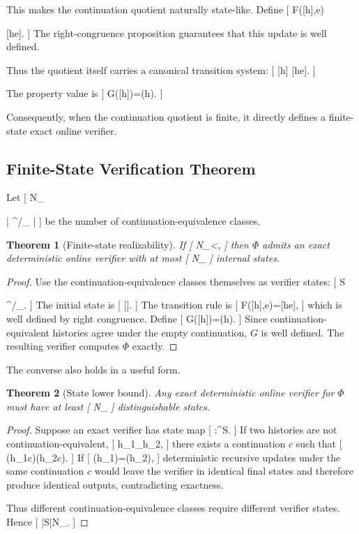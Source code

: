 \documentclass[11pt]{article}
\newtheorem{theorem}{Theorem} \newtheorem{proposition}{Proposition} \newtheorem{lemma}{Lemma} \newtheorem{corollary}{Corollary} \newtheorem{definition}{Definition} \newtheorem{remark}{Remark}
\begin{document}
This makes the continuation quotient naturally state-like. Define
[
F([h]{\equiv\Phi},e)

[he]{\equiv\Phi}.
]
The right-congruence proposition guarantees that this update is well defined.

Thus the quotient itself carries a canonical transition system:
[
[h]
[he].
]

The property value is
[
G([h])=\Phi(h).
]

Consequently, when the continuation quotient is finite, it directly defines a finite-state exact online verifier.

\subsection{Finite-State Verification Theorem}

Let
[
N_\Phi

\left|
\Sigma^\ast/{\equiv_\Phi}
\right|
]
be the number of continuation-equivalence classes.

\begin{theorem}[Finite-state realizability]
If
[
N_\Phi<\infty,
]
then $\Phi$ admits an exact deterministic online verifier with at most
[
N_\Phi
]
internal states.
\end{theorem}

\begin{proof}
Use the continuation-equivalence classes themselves as verifier states:
[
\mathcal S

\Sigma^\ast/{\equiv_\Phi}.
]
The initial state is
[
[\epsilon].
]
The transition rule is
[
F([h],e)=[he],
]
which is well defined by right congruence. Define
[
G([h])=\Phi(h).
]
Since continuation-equivalent histories agree under the empty continuation,
$G$ is well defined. The resulting verifier computes $\Phi$ exactly.
\end{proof}

The converse also holds in a useful form.

\begin{theorem}[State lower bound]
Any exact deterministic online verifier for $\Phi$ must have at least
[
N_\Phi
]
distinguishable states.
\end{theorem}

\begin{proof}
Suppose an exact verifier has state map
[
\sigma:\Sigma^\ast\to\mathcal S.
]
If two histories are not continuation-equivalent,
[
h_1\not\equiv_\Phi h_2,
]
there exists a continuation $c$ such that
[
\Phi(h_1c)\neq\Phi(h_2c).
]
If
[
\sigma(h_1)=\sigma(h_2),
]
deterministic recursive updates under the same continuation $c$ would leave the verifier in identical final states and therefore produce identical outputs, contradicting exactness.

Thus different continuation-equivalence classes require different verifier states. Hence
[
|\mathcal S|\geq N_\Phi.
]
\end{proof}
\end{document}

